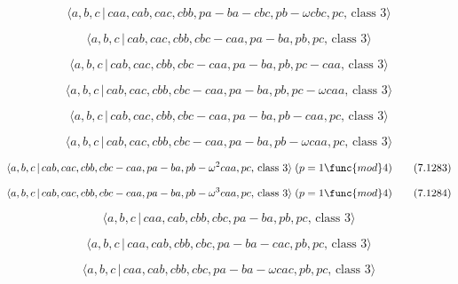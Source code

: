 \documentclass[10pt]{article}
\begin{document}
\begin{equation}
\langle a,b,c\,|\,caa,cab,cac,cbb,pa-ba-cbc,pb-\omega cbc,pc,\,\text{class }%
3\rangle  \tag{7.1277}
\end{equation}

\begin{equation}
\langle a,b,c\,|\,cab,cac,cbb,cbc-caa,pa-ba,pb,pc,\,\text{class }3\rangle 
\tag{7.1278}
\end{equation}

\begin{equation}
\langle a,b,c\,|\,cab,cac,cbb,cbc-caa,pa-ba,pb,pc-caa,\,\text{class }3\rangle
\tag{7.1279}
\end{equation}

\begin{equation}
\langle a,b,c\,|\,cab,cac,cbb,cbc-caa,pa-ba,pb,pc-\omega caa,\,\text{class }%
3\rangle  \tag{7.1280}
\end{equation}

\begin{equation}
\langle a,b,c\,|\,cab,cac,cbb,cbc-caa,pa-ba,pb-caa,pc,\,\text{class }3\rangle
\tag{7.1281}
\end{equation}

\begin{equation}
\langle a,b,c\,|\,cab,cac,cbb,cbc-caa,pa-ba,pb-\omega caa,pc,\,\text{class }%
3\rangle  \tag{7.1282}
\end{equation}

\begin{equation}
\langle a,b,c\,|\,cab,cac,cbb,cbc-caa,pa-ba,pb-\omega ^{2}caa,pc,\,\text{%
class }3\rangle \;(p=1\func{mod}4)  \tag{7.1283}
\end{equation}

\begin{equation}
\langle a,b,c\,|\,cab,cac,cbb,cbc-caa,pa-ba,pb-\omega ^{3}caa,pc,\,\text{%
class }3\rangle \;(p=1\func{mod}4)  \tag{7.1284}
\end{equation}

\begin{equation}
\langle a,b,c\,|\,caa,cab,cbb,cbc,pa-ba,pb,pc,\,\text{class }3\rangle 
\tag{7.1285}
\end{equation}

\begin{equation}
\langle a,b,c\,|\,caa,cab,cbb,cbc,pa-ba-cac,pb,pc,\,\text{class }3\rangle 
\tag{7.1286}
\end{equation}

\begin{equation}
\langle a,b,c\,|\,caa,cab,cbb,cbc,pa-ba-\omega cac,pb,pc,\,\text{class }%
3\rangle  \tag{7.1287}
\end{equation}
\end{document}

